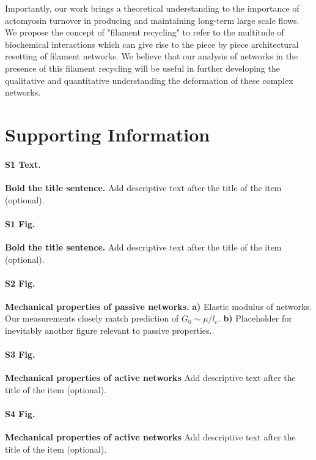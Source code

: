 \documentclass[10pt,letterpaper]{article}
\begin{document}
Importantly, our work brings a theoretical understanding to the importance of actomyosin turnover in producing and maintaining long-term large scale flows.  We propose the concept of "filament recycling" to refer to the multitude of biochemical interactions which can give rise to the piece by piece architectural resetting of filament networks.  We believe that our analysis of networks in the presence of this filament recycling will be useful in further developing the qualitative and quantitative understanding the deformation of these complex networks.

\section*{Supporting Information}

\paragraph*{S1 Text.}
\label{S1_Text}
{\bf Bold the title sentence.} Add descriptive text after the title of the item (optional).

\paragraph*{S1 Fig.}
\label{S1_Fig}
{\bf Bold the title sentence.} Add descriptive text after the title of the item (optional).

\paragraph*{S2 Fig.}
\label{fig:passive_supp}
{\bf  Mechanical properties of passive networks.}  \textbf{a)} Elastic modulus of networks.  Our measurements closely match prediction of $G_0\sim\mu/l_c$.  \textbf{b)}  Placeholder for inevitably another figure relevant to passive properties..

\paragraph*{S3 Fig.}
\label{fig:tear_supp}
{\bf Mechanical properties of active networks } Add descriptive text after the title of the item (optional).

\paragraph*{S4 Fig.}
\label{fig:active_supp}
{\bf Mechanical properties of active networks } Add descriptive text after the title of the item (optional).
\end{document}
